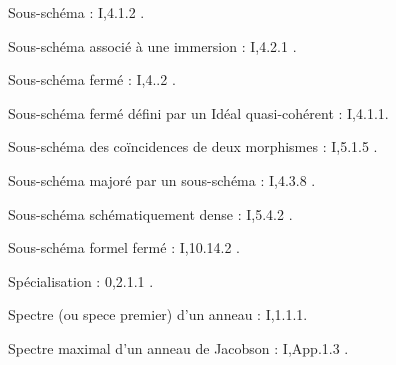 Sous-schéma : I,4.1.2 .

Sous-schéma associé à une immersion : I,4.2.1 .

Sous-schéma fermé : I,4..2 .

Sous-schéma fermé défini par un Idéal quasi-cohérent : I,4.1.1.

Sous-schéma des coïncidences de deux morphismes : I,5.1.5 .

Sous-schéma majoré par un sous-schéma : I,4.3.8 .

Sous-schéma schématiquement dense : I,5.4.2 .

Sous-schéma formel fermé : I,10.14.2 .

Spécialisation : 0,2.1.1 .

Spectre (ou spece premier) d'un anneau : I,1.1.1.

Spectre maximal d'un anneau de Jacobson : I,App.1.3 .
